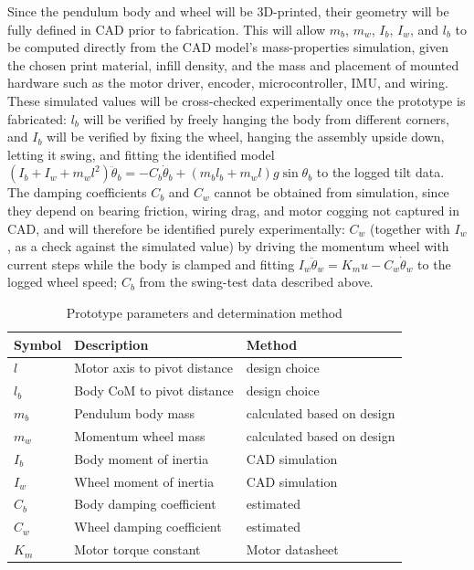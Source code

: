 Since the pendulum body and wheel will be 3D-printed, their geometry will be fully defined in CAD prior to fabrication. This will allow $m_b$, $m_w$, $I_b$, $I_w$, and $l_b$ to be computed directly from the CAD model's mass-properties simulation, given the chosen print material, infill density, and the mass and placement of mounted hardware such as the motor driver, encoder, microcontroller, IMU, and wiring. These simulated values will be cross-checked experimentally once the prototype is fabricated: $l_b$ will be verified by freely hanging the body from different corners, and $I_b$ will be verified by fixing the wheel, hanging the assembly upside down, letting it swing, and fitting the identified model $(I_b+I_w+m_wl^2)\ddot\theta_b = -C_b\dot\theta_b + (m_bl_b+m_wl)g\sin\theta_b$ to the logged tilt data. The damping coefficients $C_b$ and $C_w$ cannot be obtained from simulation, since they depend on bearing friction, wiring drag, and motor cogging not captured in CAD, and will therefore be identified purely experimentally: $C_w$ (together with $I_w$, as a check against the simulated value) by driving the momentum wheel with current steps while the body is clamped and fitting $I_w\ddot\theta_w = K_mu - C_w\dot\theta_w$ to the logged wheel speed; $C_b$ from the swing-test data described above.

\begin{table}[h]
\centering
\caption{Prototype parameters and determination method}
\begin{tabular}{lll}
\hline
Symbol & Description & Method \\
\hline
$l$ & Motor axis to pivot distance & design choice \\
$l_b$ & Body CoM to pivot distance & design choice \\
$m_b$ & Pendulum body mass & calculated based on design \\
$m_w$ & Momentum wheel mass & calculated based on design \\
$I_b$ & Body moment of inertia & CAD simulation \\
$I_w$ & Wheel moment of inertia & CAD simulation \\
$C_b$ & Body damping coefficient & estimated \\
$C_w$ & Wheel damping coefficient & estimated \\
$K_m$ & Motor torque constant & Motor datasheet \\
\hline
\end{tabular}
\end{table}

